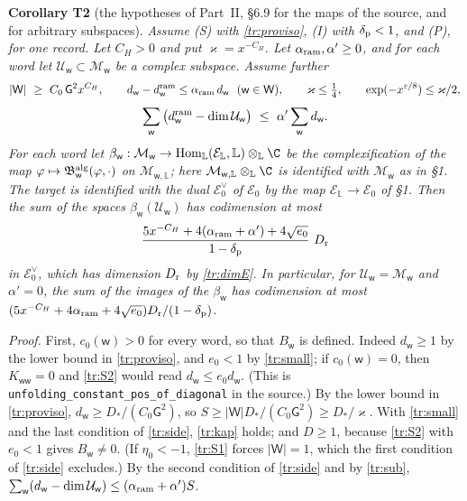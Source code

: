 \documentclass[11pt,letterpaper]{article}
\begin{document}
\textbf{Corollary T2} (the hypotheses of Part~II, \S6.9 for the maps of the source, and for arbitrary
subspaces). \emph{Assume \textup{(S)} with \eqref{tr:proviso}, \textup{(I)} with $\delta_{\rm p}<1$, and
\textup{(P)}, for one record. Let $C_H>0$ and put $\varkappa=x^{-C_H}$. Let $\alpha_{\rm ram},\alpha'\ge0$, and for each
word let $\mathcal U_{\mathsf w}\subset\mathcal M_{\mathsf w}$ be a complex subspace. Assume further}
\begin{equation}\label{tr:side}
 |\mathsf W|\ \ge\ C_0\,\mathsf G^2x^{C_H},\qquad
 d_{\mathsf w}-d^{\rm ram}_{\mathsf w}\le\alpha_{\rm ram}\,d_{\mathsf w}\ \ (\mathsf w\in\mathsf W),\qquad
 \varkappa\le\tfrac14,\qquad \exp(-x^{\varepsilon/8})\le\varkappa/2 ,
\end{equation}
\begin{equation}\label{tr:sub}
 \sum_{\mathsf w}\big(d^{\rm ram}_{\mathsf w}-\dim\mathcal U_{\mathsf w}\big)\ \le\ \alpha'\sum_{\mathsf w}d_{\mathsf w}.
\end{equation}
\emph{For each word let $\beta_{\mathsf w}:\mathcal M_{\mathsf w}\to\operatorname{Hom}_{\mathbb L}(\mathcal E_{\mathbb L},\mathbb L)\otimes_{\mathbb L}\C$
be the complexification of the map $\varphi\mapsto\mathfrak B^{\rm alg}_{\mathsf w}(\varphi,\cdot)$ on
$\mathcal M_{\mathsf w,\mathbb L}$; here $\mathcal M_{\mathsf w,\mathbb L}\otimes_{\mathbb L}\C$ is identified with
$\mathcal M_{\mathsf w}$ as in \S1. The target is identified with the dual $\mathcal E_0^\vee$ of
$\mathcal E_0$ by the map $\mathcal E_{\mathbb L}\to\mathcal E_0$ of \S1. Then the sum of the spaces
$\beta_{\mathsf w}(\mathcal U_{\mathsf w})$ has codimension at most}
\begin{equation}\label{tr:final}
 \frac{5x^{-C_H}+4(\alpha_{\rm ram}+\alpha')+4\sqrt{e_0}}{1-\delta_{\rm p}}\ D_{\rm r}
\end{equation}
\emph{in $\mathcal E_0^\vee$, which has dimension $D_{\rm r}$ by \eqref{tr:dimE}. In particular, for
$\mathcal U_{\mathsf w}=\mathcal M_{\mathsf w}$ and $\alpha'=0$, the sum of the images of the $\beta_{\mathsf w}$ has
codimension at most $(5x^{-C_H}+4\alpha_{\rm ram}+4\sqrt{e_0})D_{\rm r}/(1-\delta_{\rm p})$.}

\emph{Proof.} First, $c_0(\mathsf w)>0$ for every word, so that $B_{\mathsf w}$ is defined. Indeed
$d_{\mathsf w}\ge1$ by the lower bound in \eqref{tr:proviso}, and $e_0<1$ by \eqref{tr:small}; if
$c_0(\mathsf w)=0$, then $K_{\mathsf w\mathsf w}=0$ and \eqref{tr:S2} would read $d_{\mathsf w}\le e_0d_{\mathsf w}$.
(This is \texttt{unfolding\_constant\_pos\_of\_diagonal} in the source.) By the lower bound in
\eqref{tr:proviso}, $d_{\mathsf w}\ge D_*/(C_0\mathsf G^2)$, so
$S\ge|\mathsf W|D_*/(C_0\mathsf G^2)\ge D_*/\varkappa$. With \eqref{tr:small} and the last condition of
\eqref{tr:side}, \eqref{tr:kap} holds; and $D\ge1$, because \eqref{tr:S2} with $e_0<1$ gives $B_{\mathsf w}\ne0$. (If $\eta_0<-1$, \eqref{tr:S1} forces $|\mathsf W|=1$, which the first
condition of \eqref{tr:side} excludes.) By the second condition of \eqref{tr:side} and by \eqref{tr:sub},
$\sum_{\mathsf w}(d_{\mathsf w}-\dim\mathcal U_{\mathsf w})\le(\alpha_{\rm ram}+\alpha')S$.
\end{document}
